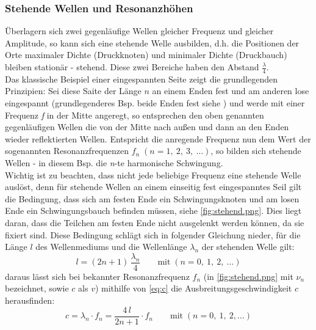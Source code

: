 \subsubsection[Stehende Wellen und Resonanzhöhen]{Stehende Wellen und Resonanzhöhen\autocite{Tipler, Video, Animation}}
Überlagern sich zwei gegenläufige Wellen gleicher Frequenz und gleicher Amplitude, so kann sich eine stehende Welle ausbilden, d.h. die Positionen der Orte maximaler Dichte (Druckknoten) und minimaler Dichte (Druckbauch) bleiben stationär - \glqq stehend\grqq. Diese zwei Bereiche haben den Abstand \(\frac{\lambda}{4}\).\\
Das klassische Beispiel einer eingespannten Seite zeigt die grundlegenden Prinzipien: Sei diese Saite der Länge \(n\) an einem Enden fest und am anderen lose eingespannt (grundlegenderes Bsp. beide Enden fest siehe \autocite{Tipler}) und werde mit einer Frequenz \emph{f} in der Mitte angeregt, so entsprechen den oben genannten gegenläufigen Wellen die von der Mitte nach außen und dann an den Enden wieder reflektierten Wellen. Entspricht die anregende Frequenz nun dem Wert der sogenannten Resonanzfrequenzen \(f_n\;(n = 1,\ 2,\ 3,\ \ldots)\), so bilden sich stehende Wellen - in diesem Bsp. die \emph{n}-te harmonische Schwingung.\\
Wichtig ist zu beachten, dass nicht jede beliebige Frequenz eine stehende Welle auslöst, denn für stehende Wellen an einem einseitig fest eingespanntes Seil gilt die Bedingung, dass sich am festen Ende ein Schwingungsknoten und am losen Ende ein Schwingungsbauch befinden müssen, siehe \cref{fig:stehend.png}. Dies liegt daran, dass die Teilchen am festen Ende nicht ausgelenkt werden können, da sie fixiert sind. Diese Bedingung schlägt sich in folgender Gleichung nieder, für die Länge \(l\) des Wellenmediums und die Wellenlänge \(\lambda_n \) der stehenden Welle gilt:
\begin{equation}
    l=(2n+1)\,\frac{\lambda_n}{4}\qquad\text{mit}\;(n = 0,\ 1,\ 2,\ \ldots)
    \label{eq:l}
\end{equation}
daraus lässt sich bei bekannter Resonanzfrequenz \(f_n\) (in \cref{fig:stehend.png} mit \(\nu_n\) bezeichnet, sowie \(c\) als \(v\)) mithilfe von \cref{eq:c} die Ausbreitungsgeschwindigkeit \(c\) herausfinden:
\begin{equation}
    c=\lambda_n\cdot f_n=\frac{4\,l}{2n+1}\cdot f_n\qquad \text{mit}\;(n = 0,\ 1,\ 2, \ldots)
    \label{eq:c_n}
\end{equation}


